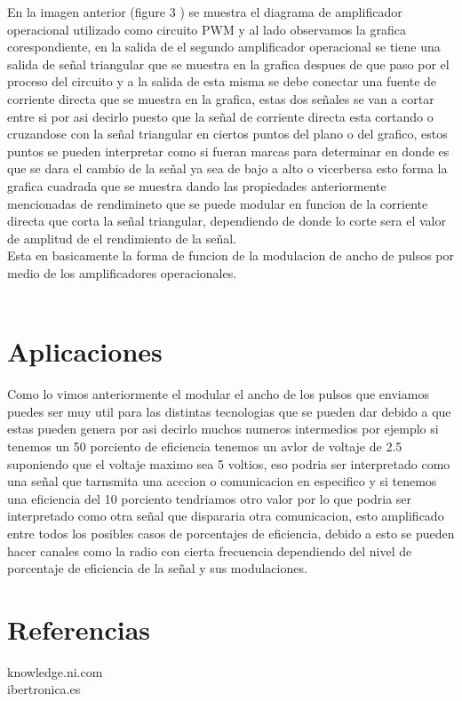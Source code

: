 \documentclass[12pt]{article}
\begin{document}
En la imagen anterior (figure 3 ) se muestra el diagrama de amplificador operacional utilizado como circuito PWM y al lado observamos la grafica corespondiente, en la salida de el segundo amplificador operacional se tiene una salida de señal triangular que se muestra en la grafica despues de que paso por el proceso del circuito y a la salida de esta misma se debe conectar una fuente de corriente directa que se muestra en la grafica, estas dos señales se van a cortar entre si por asi decirlo puesto que la señal de corriente directa esta cortando o cruzandose con la señal triangular en ciertos puntos del plano o del grafico, estos puntos se pueden interpretar como si fueran marcas para determinar en donde es que se dara el cambio de la señal ya sea de bajo a alto o vicerbersa esto forma la grafica cuadrada que se muestra dando las propiedades anteriormente mencionadas de rendimineto que se puede modular en funcion de la corriente directa que corta la señal triangular, dependiendo de donde lo corte sera el valor de amplitud de el rendimiento de la señal.\\
Esta en basicamente la forma de funcion de la modulacion de ancho de pulsos por medio de los amplificadores operacionales.\\
\\
\section{Aplicaciones}
Como lo vimos anteriormente el modular el ancho de los pulsos que enviamos puedes ser muy util para las distintas tecnologias que se pueden dar debido a que estas pueden genera por asi decirlo muchos numeros intermedios por ejemplo si tenemos un 50 porciento de eficiencia tenemos un avlor de voltaje de 2.5 suponiendo que el voltaje maximo sea 5 voltios, eso podria ser interpretado como una señal que tarnsmita una acccion o comunicacion en especifico y si tenemos una eficiencia del 10  porciento tendriamos otro valor por lo que podria ser interpretado como otra señal que dispararia otra comunicacion, esto amplificado entre todos los posibles casos de porcentajes de eficiencia, debido a esto se pueden hacer canales como la radio con cierta frecuencia dependiendo del nivel de porcentaje de eficiencia de la señal y sus modulaciones.
\section {Referencias}
knowledge.ni.com\\
ibertronica.es
\end{document}
